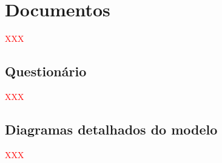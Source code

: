 
\chapter{Documentos}
\label{Appendice:Documentos}

\textcolor{red}{XXX}

\section{Questionário}

\textcolor{red}{XXX}

\newpage
\section{Diagramas detalhados do modelo}

\textcolor{red}{XXX}

